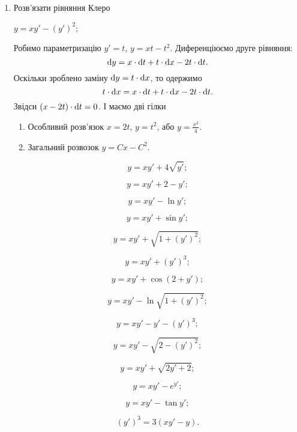 \begin{enumerate}
\item Розв’язати рівняння Клеро
\begin{example}
	$y = x y' - (y')^2$;
\end{example}
\begin{solution}
	Робимо параметризацію $y' = t$, $y = x t - t^2$. Диференціюємо друге рівняння:
	\[ \mathop{}\!\mathrm{d} y = x \cdot \mathop{}\!\mathrm{d} t + t \cdot \mathop{}\!\mathrm{d} x - 2 t \cdot \mathop{}\!\mathrm{d} t.\]
	Оскільки зроблено заміну $\mathop{}\!\mathrm{d} y = t \cdot \mathop{}\!\mathrm{d} x$, то одержимо
	\[ t \cdot \mathop{}\!\mathrm{d} x = x \cdot \mathop{}\!\mathrm{d} t + t \cdot \mathop{}\!\mathrm{d} x - 2 t \cdot \mathop{}\!\mathrm{d} t.\]
	Звідси $(x - 2t) \cdot \mathop{}\!\mathrm{d} t = 0$. І маємо дві гілки
	\begin{enumerate}
		\item Особливий розв’язок $x = 2t$, $y = t^2$, або $y = \frac{x^2}{4}$.
		\item Загальний розвозок $y = C x - C^2$.
	\end{enumerate}
\end{solution}
\begin{multicols}{2}
\begin{problem}
	\[ y=xy'+4\sqrt{y'}; \]
\end{problem}
\begin{problem}
	\[ y=xy'+2-y'; \]
\end{problem}
\begin{problem}
	\[ y=xy'-\ln y'; \]
\end{problem}
\begin{problem}
	\[ y=xy'+\sin y'; \]
\end{problem}
\begin{problem}
	\[ y=xy'+\sqrt{1+(y')^2}; \]
\end{problem}
\begin{problem}
	\[ y=xy'+(y')^3; \]
\end{problem}
\begin{problem}
	\[ y=xy'+\cos(2+y'); \]
\end{problem}
\begin{problem}
	\[ y=xy'-\ln\sqrt{1+(y')^2}; \]
\end{problem}
\begin{problem}
	\[ y=xy'-y'-(y')^3; \]
\end{problem}
\begin{problem}
	\[ y=xy'-\sqrt{2-(y')^2}; \]
\end{problem}
\begin{problem}
	\[ y=xy'+\sqrt{2y'+2}; \]
\end{problem}
\begin{problem}
	\[ y=xy'-e^{y'}; \]
\end{problem}
\begin{problem}
	\[ y=xy'-\tan y'; \]
\end{problem}
\begin{problem}
	\[ (y')^3=3(xy'-y). \]
\end{problem}
\end{multicols}


\end{enumerate}
